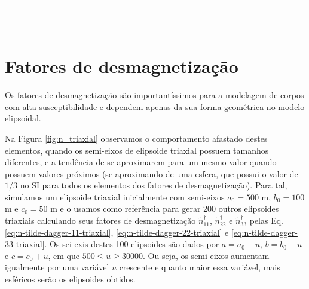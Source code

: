 \begin{table}[h!]
	\begin{center}
		\begin{tabular}{lc}
			
			&  \\
			& \\
			& \\
			& \\
			& \\
			& \\ 
			& \\
			& \\
		\end{tabular}
	\end{center}
\end{table}

\section{Fatores de desmagnetização}

Os fatores de desmagnetização são importantíssimos para a modelagem de corpos com alta susceptibilidade e dependem apenas da sua forma geométrica no modelo elipsoidal. 

Na Figura \ref{fig:n_triaxial} observamos o comportamento afastado destes elementos, quando os semi-eixos de elipsoide triaxial possuem tamanhos diferentes, e a tendência de se aproximarem para um mesmo valor quando possuem valores próximos (se aproximando de uma esfera, que possui o valor de $1/3$ no SI para todos os elementos dos fatores de desmagnetização). Para tal, simulamos um elipsoide triaxial inicialmente com semi-eixos $a_0=500$ m, $b_0=100$ m e $c_0=50$ m e o usamos como referência para gerar 200 outros elipsoides triaxiais calculando seus fatores de desmagnetização $\tilde{n}^{\dagger}_{11}$, $\tilde{n}^{\dagger}_{22}$ e $\tilde{n}^{\dagger}_{33}$ pelas Eq. \ref{eq:n-tilde-dagger-11-triaxial}, \ref{eq:n-tilde-dagger-22-triaxial} e \ref{eq:n-tilde-dagger-33-triaxial}. Os sei-exis destes 100 elipsoides são dados por $a=a_0+u$, $b=b_0+u$ e $c=c_0+u$, em que $500 \le u \ge 30000$. Ou seja, os semi-eixos aumentam igualmente por uma variável $u$ crescente e quanto maior essa variável, mais esféricos serão os elipsoides obtidos.


